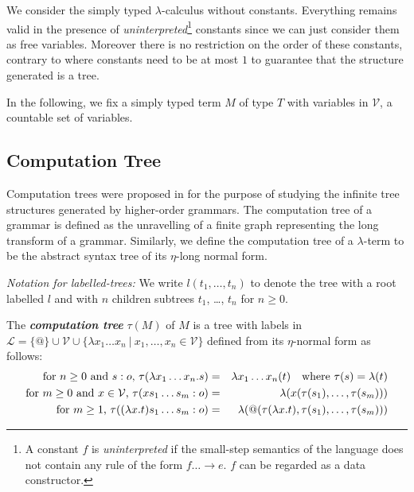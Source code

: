 \documentclass{llncs}
\newcommand\defname[1]{{\bf\em #1}\index{#1}}
\newcommand\union{\cup}
\begin{document}
We consider the simply typed $\lambda$-calculus without constants. Everything remains valid in the presence of
\emph{uninterpreted}\footnote{A constant $f$ is \emph{uninterpreted}
if the small-step semantics of the language does not contain any rule of the form $f \dots \rightarrow e$. $f$ can be regarded as a data constructor.}
constants since we can just consider them as free variables. Moreover there is no restriction on the order of these constants, contrary to \cite{OngLics2006} where constants need to be at most $1$ to guarantee that the structure generated is a tree.

In the following, we fix a simply typed term $M$ of type $T$ with variables in $\mathcal{V}$, a countable set of variables.
\subsection{Computation Tree}

Computation trees were proposed in \cite{OngLics2006} for the purpose of studying the infinite tree structures generated by higher-order grammars. The computation tree of a grammar is defined as the unravelling of a finite graph representing the long transform of a grammar. Similarly, we define the computation tree of a $\lambda$-term to be the abstract syntax tree of its $\eta$-long normal form.

\emph{Notation for labelled-trees:} We write $l(t_1, \ldots, t_n)$ to denote the tree with a root labelled $l$ and with $n$ children subtrees $t_1$, \ldots, $t_n$ for $
n \geq 0$.

\begin{definition}
The \defname{computation tree} $\tau(M)$ of $M$ is
a tree with labels in $ \mathcal{L} = \{ @ \} \union \mathcal{V} \union \{ \lambda x_1 \ldots x_n \ | \ x_1 ,\ldots, x_n \in \mathcal{V} \}$ defined from its $\eta$-normal form as follows:
\begin{eqnarray*}
  \mbox{for $n\geq 0$ and $s:o$, } \tau(\lambda x_1 \ldots x_n . s) &=& \lambda x_1 \ldots x_n(t) \mbox{\quad where $\tau(s) = \lambda(t)$}\\
  \mbox{for $m\geq 0$ and $x \in  \mathcal{V}$, } \tau( x s_1 \ldots s_m : o) &=&  \lambda (x(\tau(s_1),\ldots,\tau(s_m)))\\
  \mbox{for $m \geq 1$, } \tau((\lambda x.t) s_1 \ldots s_m :o) &=& \lambda (@(\tau(\lambda x.t),\tau(s_1),\ldots,\tau(s_m)))
\end{eqnarray*}
\end{definition}
\end{document}
